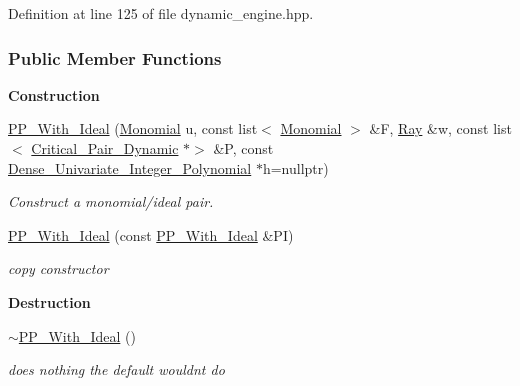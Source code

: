 Definition at line 125 of file dynamic\+\_\+engine.\+hpp.

\subsubsection*{Public Member Functions}
\begin{Indent}\textbf{ Construction}\par
\begin{DoxyCompactItemize}
\item 
\hyperlink{group___g_b_computation_ab79e52cd576b29fc48e7d9ad49303ae7}{P\+P\+\_\+\+With\+\_\+\+Ideal} (\hyperlink{group__polygroup_class_monomial}{Monomial} u, const list$<$ \hyperlink{group__polygroup_class_monomial}{Monomial} $>$ \&F, \hyperlink{group___c_l_s_solvers_class_l_p___solvers_1_1_ray}{Ray} \&w, const list$<$ \hyperlink{group___g_b_computation_class_critical___pair___dynamic}{Critical\+\_\+\+Pair\+\_\+\+Dynamic} $\ast$$>$ \&P, const \hyperlink{group__polygroup_class_dense___univariate___integer___polynomial}{Dense\+\_\+\+Univariate\+\_\+\+Integer\+\_\+\+Polynomial} $\ast$h=nullptr)
\begin{DoxyCompactList}\small\item\em Construct a monomial/ideal pair. \end{DoxyCompactList}\item 
\mbox{\label{group___g_b_computation_ac71ad235934d824958a14443be77789e}} 
\hyperlink{group___g_b_computation_ac71ad235934d824958a14443be77789e}{P\+P\+\_\+\+With\+\_\+\+Ideal} (const \hyperlink{group___g_b_computation_class_dynamic___engine_1_1_p_p___with___ideal}{P\+P\+\_\+\+With\+\_\+\+Ideal} \&PI)
\begin{DoxyCompactList}\small\item\em copy constructor \end{DoxyCompactList}\end{DoxyCompactItemize}
\end{Indent}
\begin{Indent}\textbf{ Destruction}\par
\begin{DoxyCompactItemize}
\item 
\mbox{\label{group___g_b_computation_a1dd0ce9a355f10837a180b1599a2666f}} 
\hyperlink{group___g_b_computation_a1dd0ce9a355f10837a180b1599a2666f}{$\sim$\+P\+P\+\_\+\+With\+\_\+\+Ideal} ()
\begin{DoxyCompactList}\small\item\em does nothing the default wouldn\textquotesingle{}t do \end{DoxyCompactList}\end{DoxyCompactItemize}
\end{Indent}

